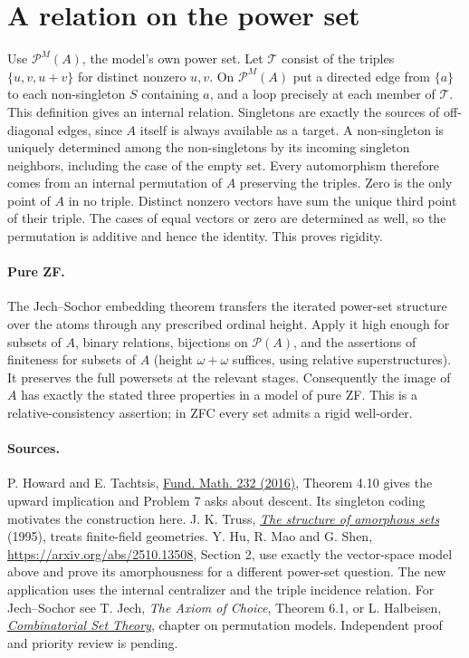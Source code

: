 \documentclass[11pt]{article}
\begin{document}
\section{A relation on the power set}
Use $\mathcal P^M(A)$, the model's own power set. Let $\mathcal T$ consist of the triples $\{u,v,u+v\}$ for distinct nonzero $u,v$. On $\mathcal P^M(A)$ put a directed edge from $\{a\}$ to each non-singleton $S$ containing $a$, and a loop precisely at each member of $\mathcal T$. This definition gives an internal relation. Singletons are exactly the sources of off-diagonal edges, since $A$ itself is always available as a target. A non-singleton is uniquely determined among the non-singletons by its incoming singleton neighbors, including the case of the empty set. Every automorphism therefore comes from an internal permutation of $A$ preserving the triples. Zero is the only point of $A$ in no triple. Distinct nonzero vectors have sum the unique third point of their triple. The cases of equal vectors or zero are determined as well, so the permutation is additive and hence the identity. This proves rigidity.
\paragraph{Pure ZF.} The Jech--Sochor embedding theorem transfers the iterated power-set structure over the atoms through any prescribed ordinal height. Apply it high enough for subsets of $A$, binary relations, bijections on $\mathcal P(A)$, and the assertions of finiteness for subsets of $A$ (height $\omega+\omega$ suffices, using relative superstructures). It preserves the full powersets at the relevant stages. Consequently the image of $A$ has exactly the stated three properties in a model of pure ZF. This is a relative-consistency assertion; in ZFC every set admits a rigid well-order.
\paragraph{Sources.} P. Howard and E. Tachtsis, \href{https://doi.org/10.4064/fm960-12-2015}{Fund. Math. 232 (2016)}, Theorem 4.10 gives the upward implication and Problem 7 asks about descent. Its singleton coding motivates the construction here. J. K. Truss, \href{https://www.sciencedirect.com/science/article/pii/016800729400024W}{\emph{The structure of amorphous sets}} (1995), treats finite-field geometries. Y. Hu, R. Mao and G. Shen, \url{https://arxiv.org/abs/2510.13508}, Section 2, use exactly the vector-space model above and prove its amorphousness for a different power-set question. The new application uses the internal centralizer and the triple incidence relation. For Jech--Sochor see T. Jech, \emph{The Axiom of Choice}, Theorem 6.1, or L. Halbeisen, \href{https://people.math.ethz.ch/~halorenz/publications/pdf/cst.pdf}{\emph{Combinatorial Set Theory}}, chapter on permutation models. Independent proof and priority review is pending.
\end{document}
